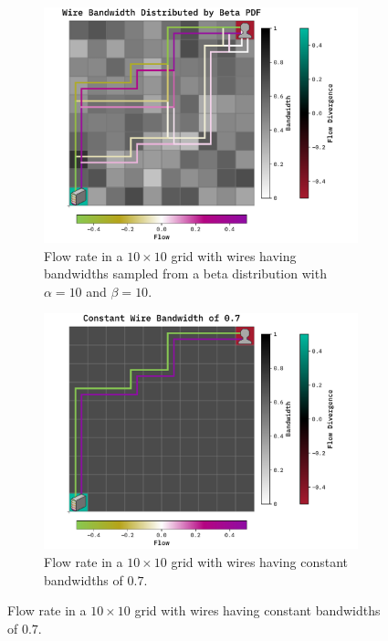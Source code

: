 \documentclass[10pt, titlepage, a4paper]{article}
\begin{document}
\begin{figure}[H]
    \centering
    \begin{subfigure}[t]{0.45\textwidth}
        \includegraphics[width=\textwidth]{../Images/arbitrary-2-beta.pdf}
        \caption{Flow rate in a $10\times 10$ grid with wires having bandwidths sampled from a beta distribution with $\alpha = 10$ and $\beta = 10$.}
        \label{fig:ar2-beta}
    \end{subfigure}\hspace{1.0cm}
    \begin{subfigure}[t]{0.45\textwidth}
        \includegraphics[width=\textwidth]{../Images/arbitrary-2-constant.pdf}
        \caption{Flow rate in a $10\times 10$ grid with wires having constant bandwidths of $0.7$.}
        \label{fig:ar2-const}
    \end{subfigure}
\end{figure}
\end{document}
